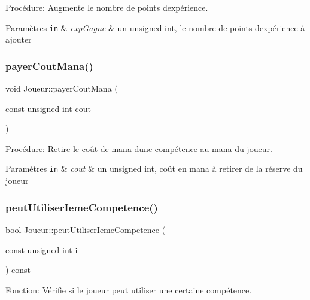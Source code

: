 Procédure\+: Augmente le nombre de points d\textquotesingle{}expérience. 


\begin{DoxyParams}[1]{Paramètres}
\mbox{\tt in}  & {\em exp\+Gagne} & un unsigned int, le nombre de points d\textquotesingle{}expérience à ajouter \\
\hline
\end{DoxyParams}
\mbox{\label{classJoueur_a3e461446055f364483c8315d7e611793}} 
\subsubsection{\texorpdfstring{payer\+Cout\+Mana()}{payerCoutMana()}}
{\footnotesize\ttfamily void Joueur\+::payer\+Cout\+Mana (\begin{DoxyParamCaption}\item[{const unsigned int}]{cout }\end{DoxyParamCaption})}



Procédure\+: Retire le coût de mana d\textquotesingle{}une compétence au mana du joueur. 


\begin{DoxyParams}[1]{Paramètres}
\mbox{\tt in}  & {\em cout} & un unsigned int, coût en mana à retirer de la réserve du joueur \\
\hline
\end{DoxyParams}
\mbox{\label{classJoueur_a7e9c44aa28a9b9578af732651f76c82d}} 
\subsubsection{\texorpdfstring{peut\+Utiliser\+Ieme\+Competence()}{peutUtiliserIemeCompetence()}}
{\footnotesize\ttfamily bool Joueur\+::peut\+Utiliser\+Ieme\+Competence (\begin{DoxyParamCaption}\item[{const unsigned int}]{i }\end{DoxyParamCaption}) const}



Fonction\+: Vérifie si le joueur peut utiliser une certaine compétence. 


